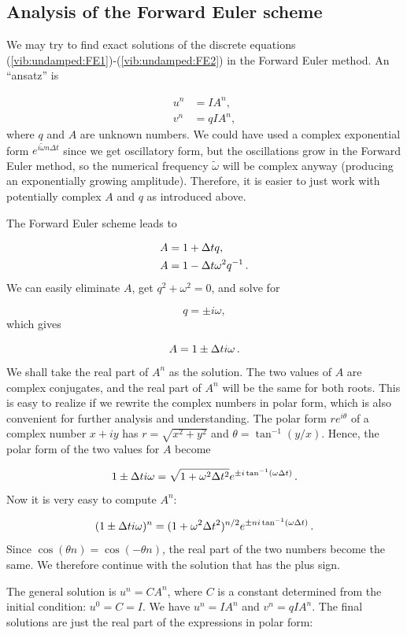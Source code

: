 \documentclass[%
oneside,                 %
final,                   %
10pt]{article}
\begin{document}
\subsection{Analysis of the Forward Euler scheme}

We may try to find exact solutions of the discrete
equations (\ref{vib:undamped:FE1})-(\ref{vib:undamped:FE2})
in the Forward Euler method. An ``ansatz''
is

\begin{align*}
u^n &= IA^n,\\ 
v^n &= qIA^n,
\end{align*}
where $q$ and $A$ are unknown numbers. We could have used a complex
exponential form $e^{i\tilde\omega n\Delta t}$ since we get
oscillatory form, but the oscillations grow in the Forward Euler
method, so the numerical frequency $\tilde\omega$ will be complex
anyway (producing an exponentially growing amplitude). Therefore, it is
easier to just work with potentially complex $A$ and $q$ as introduced
above.

The Forward Euler scheme leads to

\begin{align*}
A &= 1 + \Delta t q,\\ 
A &= 1 - \Delta t\omega^2 q^{-1}\tp
\end{align*}
We can easily eliminate $A$, get $q^2 + \omega^2=0$, and solve for

\[ q = \pm i\omega,\]
which gives

\[ A = 1 \pm \Delta t i\omega\tp\]
We shall take the real part of $A^n$ as the solution. The two
values of $A$ are complex conjugates, and the real part of
$A^n$ will be the same for both roots. This is easy to realize if
we rewrite the complex numbers in polar form,
which is also convenient
for further analysis and understanding.
The polar form $re^{i\theta}$ of a complex number $x+iy$ has
$r=\sqrt{x^2+y^2}$ and $\theta = \tan^{-1}(y/x)$.
Hence, the polar form of the two values for $A$ become

\[ 1 \pm \Delta t i\omega = \sqrt{1+\omega^2\Delta t^2}e^{\pm i\tan^{-1}(\omega\Delta t)}\tp\]
Now it is very easy to compute $A^n$:

\[ (1 \pm \Delta t i\omega)^n = (1+\omega^2\Delta t^2)^{n/2}e^{\pm ni\tan^{-1}(\omega\Delta t)}\tp\]
Since $\cos (\theta n) = \cos (-\theta n)$, the real part of the two
numbers become the same. We therefore continue with the solution that has
the plus sign.

The general solution is $u^n = CA^n$, where
$C$ is a constant determined from the initial condition:
$u^0=C=I$. We have $u^n=IA^n$ and
$v^n=qIA^n$. The final solutions
are just the real part of the expressions in polar form:
\end{document}
